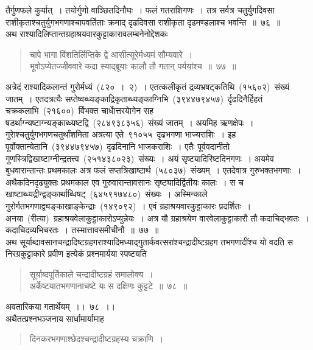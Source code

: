 \documentclass[11pt, openany]{book}
\begin{document}
\newpage
\thispagestyle{fancy}
\fancyhf{}
\noindent
तैर्गुणफले कुर्यात्~। तयोर्गुणो वाञ्छितदिनौघः~। फलं गतराशिगणः~। तत्र सर्वत्र चतुर्युगदिवसा राशीकृताश्चतुर्युगभगणाश्चापवर्तिताः क्रमाद् दृढदिवसा राशीकृता दृढमण्डलाश्च भवन्ति~॥~७६~॥\\
अथ राश्यादिलिप्तान्तग्रहाश्रयवारकुट्टाकारावलम्बनेनोद्देशकः\textendash
\begin{quote}
{\ku चापे भागा विंशतिर्लिप्तिके द्वे आसीत्सूरेर्मध्यमं सौम्यवारे~।\\
भूवोऽप्येतज्जीववारे कदा स्याद्ब्रूयाः कालौ तौ गतान् पर्ययांश्च~॥~७७~॥}
\end{quote}
अत्रेदं राश्यादिकलान्तं गुरोर्मध्यं~(८२०~।~२)~। एतत्कलीकृतं द्रव्यभ्रषट्कतिथि~(१५६०२)~संख्यं जातम्~। एतदत्रत्यैः सप्तेष्वब्ध्यङ्काद्रिकृताब्ध्यङ्काग्निभि~(३९४४७९४५७)~र्दृढदिनैर्हिहतं चक्रकलाभि~(२१६००)~र्विभक्त चार्धाेत्तरयाेगेन सह षडर्थाग्न्यष्टाग्न्यङ्काब्ध्यष्टद्वि~(२८४९३८३५६)~संख्यं जातम्~। अयमिह ऋणक्षेपः~। गुराेश्चतुर्युगभगणचतुर्थांशमिता अत्रत्या एते~९१०५५~दृढभगणा भाज्यराशिः~। इह पूर्वोक्तान्येतानि~(३९४४७९४५७)~दृढदिनानि भाजकराशिः~। एतैः पूर्ववदानीतो
गुणस्त्रिद्विखाष्टाग्नीन्द्रतत्त्व~(२५१४३८०२३)~संख्यः~। अयं सृष्ट्यादिरिष्टदिनगणः~। अयमेव बुधवारान्तान्तः प्रथमकालः अत्र फलं सप्तत्रिखाष्टार्थ~(५८०३७)~संख्यम्~। एतदेवात्र गुरुभक्तभगणाः~। अथैकदिनदृढयुक्तः प्रथमकाल एव गुरुवारान्तावसानः सृष्ट्यादिर्द्वितीयः कालः~। स च खाष्टाब्ध्यद्रीन्द्वङ्कार्थाब्धिषट्~(६४५९१७४८०)~संख्यः~।
अस्मिन्काले गुरोर्गतभगणाद्व्यङ्काखाङ्केन्द्राः~(१४९०९२)~। एवं ग्रहाश्रयवारकुट्टाकारः प्रदर्शितः~। अनया~(रीत्या)~ग्रहाश्रयवेलाकुट्टाकारोऽप्युन्नेयः~। अत्र यौ ग्रहाश्रयेण वारवेलाकुट्टाकारौ तौ कदाचिद्भवतः~। कदाचिदव्यभिचरतः~। तस्मात्तावसमीचीनौ~॥~७७~॥\\
\indent
अथ सूर्याब्दावसानचन्द्रादिष्टग्रहगराश्यादिमध्याद्गुतार्कवत्सरांश्चन्द्रादीष्टग्रहग
तभगणादींश्च यो वदति स निरग्रकुट्टाकारे प्रवीण इत्येकं प्रश्नमार्यया स्पष्टयति\textendash
\begin{quote}
{\ks सूर्याब्दपूर्तिकाले चन्द्रादीष्टग्रहं समालोक्य~।\\
अर्केष्टयातभगणानाचष्टे यः स दक्षिणः कुट्टटे~॥~७८~॥}
\end{quote}
अवतारिकया गतार्थेयम्~।।~७८~।।\\
\indent
अथैतत्प्रश्नभञ्जनाय सार्धामार्यामाह\textendash
\begin{quote}
{\ks दिनकरभगणाश्छेदश्चन्द्रादीष्टग्रहस्य चक्राणि~।}
\end{quote}
\end{document}
